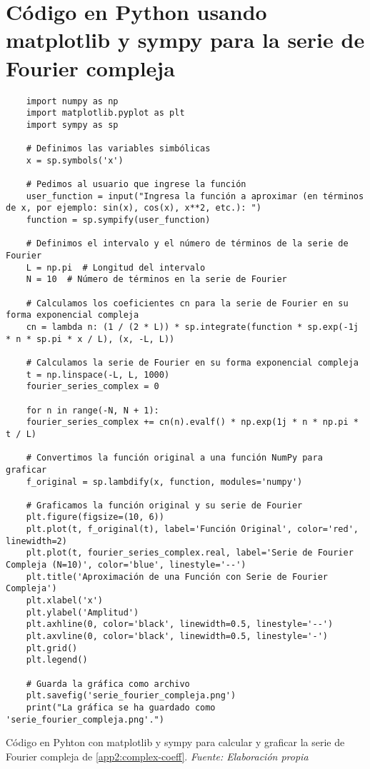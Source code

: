 \section{Código en Python usando matplotlib y sympy para la serie de Fourier compleja}\label{app3:complex-code-python-matplotlib-sympy}
\begin{longlisting}
	\begin{verbatim}
	import numpy as np
	import matplotlib.pyplot as plt
	import sympy as sp
	
	# Definimos las variables simbólicas
	x = sp.symbols('x')
	
	# Pedimos al usuario que ingrese la función
	user_function = input("Ingresa la función a aproximar (en términos de x, por ejemplo: sin(x), cos(x), x**2, etc.): ")
	function = sp.sympify(user_function)
	
	# Definimos el intervalo y el número de términos de la serie de Fourier
	L = np.pi  # Longitud del intervalo
	N = 10  # Número de términos en la serie de Fourier
	
	# Calculamos los coeficientes cn para la serie de Fourier en su forma exponencial compleja
	cn = lambda n: (1 / (2 * L)) * sp.integrate(function * sp.exp(-1j * n * sp.pi * x / L), (x, -L, L))
	
	# Calculamos la serie de Fourier en su forma exponencial compleja
	t = np.linspace(-L, L, 1000)
	fourier_series_complex = 0
	
	for n in range(-N, N + 1):
	fourier_series_complex += cn(n).evalf() * np.exp(1j * n * np.pi * t / L)
	
	# Convertimos la función original a una función NumPy para graficar
	f_original = sp.lambdify(x, function, modules='numpy')
	
	# Graficamos la función original y su serie de Fourier
	plt.figure(figsize=(10, 6))
	plt.plot(t, f_original(t), label='Función Original', color='red', linewidth=2)
	plt.plot(t, fourier_series_complex.real, label='Serie de Fourier Compleja (N=10)', color='blue', linestyle='--')
	plt.title('Aproximación de una Función con Serie de Fourier Compleja')
	plt.xlabel('x')
	plt.ylabel('Amplitud')
	plt.axhline(0, color='black', linewidth=0.5, linestyle='--')
	plt.axvline(0, color='black', linewidth=0.5, linestyle='-')
	plt.grid()
	plt.legend()
	
	# Guarda la gráfica como archivo
	plt.savefig('serie_fourier_compleja.png')
	print("La gráfica se ha guardado como 'serie_fourier_compleja.png'.")
	\end{verbatim}
	\caption[Código en Pyhton con matplotlib y sympy para calcular y graficar la serie de Fourier compleja de \ref{app2:complex-coeff}.] {Código en Pyhton con matplotlib y sympy para calcular y graficar la serie de Fourier compleja de \ref{app2:complex-coeff}. \textit{Fuente: Elaboración propia}} 
\end{longlisting}


